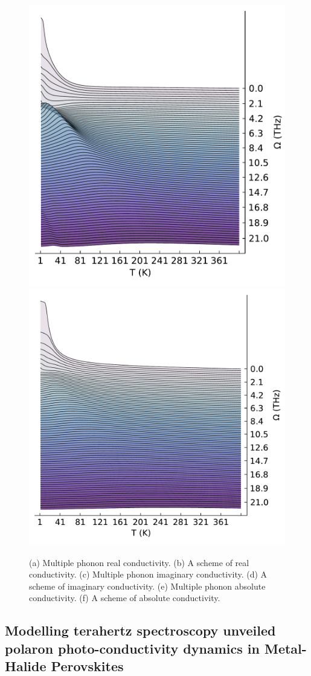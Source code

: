\begin{figure}
    \includegraphics[width=.49\textwidth]{figures/multi_plot_freq_abs.pdf}
    \includegraphics[width=.49\textwidth]{figures/A_plot_freq_abs.pdf}
    \caption{(a) Multiple phonon real conductivity. (b) A scheme of real conductivity. (c) Multiple phonon imaginary conductivity. (d) A scheme of imaginary conductivity. (e) Multiple phonon absolute conductivity. (f) A scheme of absolute conductivity.}
\end{figure}

\subsection{Modelling terahertz spectroscopy unveiled polaron photo-conductivity dynamics in Metal-Halide Perovskites}

